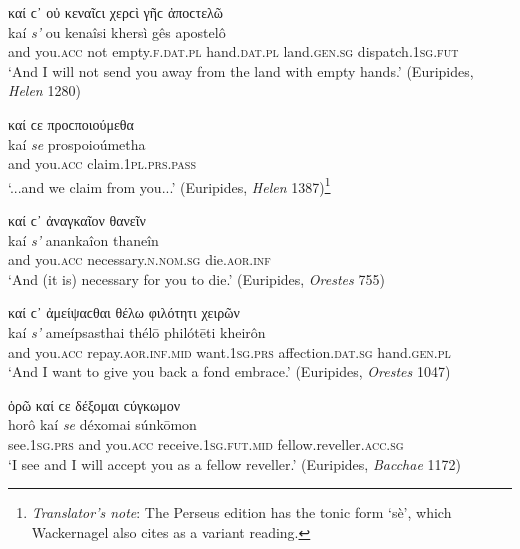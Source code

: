 \begin{exe}
\ex καί ϲ᾽ οὐ κεναῖϲι χερϲὶ γῆϲ ἀποϲτελῶ\\
\gll kaí \emph{s'} ou kenaîsi khersì gês apostelô\\
and you.\textsc{acc} not empty.\textsc{f.dat.pl} hand.\textsc{dat.pl} land.\textsc{gen.sg} dispatch.\textsc{1sg.fut}\\
\trans `And I will not send you away from the land with empty hands.' (Euripides, \textit{Helen} 1280)
\label{kaise4}
\end{exe}

\begin{exe}
\ex καί ϲε προϲποιούμεθα\\
\gll kaí \emph{se} prospoioúmetha\\
and you.\textsc{acc} claim.\textsc{1pl.prs.pass}\\
\trans `...and we claim from you...' (Euripides, \textit{Helen} 1387)\footnote{\emph{Translator's note}: The Perseus edition has the tonic form `sè', which Wackernagel also cites as a variant reading.}
\label{kaise5}
\end{exe}

\begin{exe}
\ex καί ϲ᾽ ἀναγκαῖον θανεῖν\\
\gll kaí \emph{s'} anankaîon thaneîn\\
and you.\textsc{acc} necessary.\textsc{n.nom.sg} die.\textsc{aor.inf}\\
\trans `And (it is) necessary for you to die.' (Euripides, \textit{Orestes} 755)
\label{kaise6}
\end{exe}

\begin{exe}
\ex καί ϲ᾽ ἀμείψαϲθαι θέλω φιλότητι χειρῶν\\
\gll kaí \emph{s'} ameípsasthai thélō philótēti kheirôn\\
and you.\textsc{acc} repay.\textsc{aor.inf.mid} want.\textsc{1sg.prs} affection.\textsc{dat.sg} hand.\textsc{gen.pl}\\
\trans `And I want to give you back a fond embrace.' (Euripides, \textit{Orestes} 1047)
\label{kaise7}
\end{exe}

\begin{exe}
\ex ὁρῶ καί ϲε δέξομαι ϲύγκωμον\\
\gll horô kaí \emph{se} déxomai súnkōmon\\
see.\textsc{1sg.prs} and you.\textsc{acc} receive.\textsc{1sg.fut.mid}
fellow.reveller.\textsc{acc.sg}\\
\trans `I see and I will accept you as a fellow reveller.' (Euripides, \textit{Bacchae} 1172)
\label{kaise8}
\end{exe}

